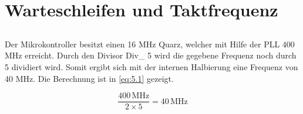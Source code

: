 \section{Warteschleifen und Taktfrequenz}
\subsection{}
Der Mikrokontroller besitzt einen 16 MHz Quarz, welcher mit Hilfe der PLL 400 MHz erreicht. Durch den Divisor Div\_ 5 wird die gegebene Frequenz noch durch 5 dividiert wird. Somit ergibt sich mit der internen Halbierung eine Frequenz von 40 MHz. Die Berechnung ist in \autoref{eq:5.1} gezeigt.
 
\begin{equation}
\label{eq:5.1}
\frac{400\,\text{MHz}}{2\times 5}=40\,\text{MHz}
\end{equation}

